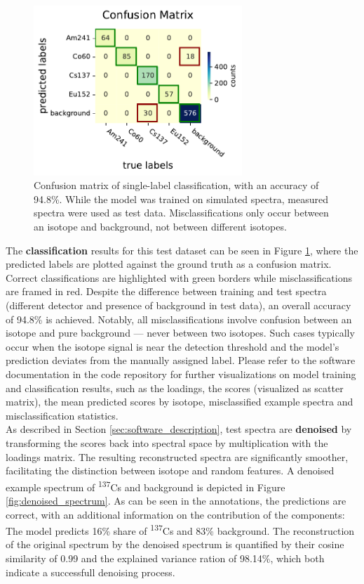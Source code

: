 \documentclass[review, 12pt, a4paper]{elsarticle}
\begin{document}
\begin{figure}
\centering
\includegraphics[width=0.7\textwidth]{Confusion_matrix_.pdf}
\caption{Confusion matrix of single-label classification, with an accuracy of 94.8\%. While the model was trained on simulated spectra, measured spectra were used as test data. Misclassifications only occur between an isotope and background, not between different isotopes.}
\label{fig:confusion_matrix}
\end{figure}

The \textbf{classification} results for this test dataset can be seen in Figure \ref{fig:confusion_matrix}, where the predicted labels are plotted against the ground truth as a confusion matrix. Correct classifications are highlighted with green borders while misclassifications are framed in red. Despite the difference between training and test spectra (different detector and presence of background in test data), an overall accuracy of 94.8\% is achieved. Notably, all misclassifications involve confusion between an isotope and pure background — never between two isotopes. Such cases typically occur when the isotope signal is near the detection threshold and the model's prediction deviates from the manually assigned label. Please refer to the software documentation in the code repository for further visualizations on model training and classification results, such as the loadings, the scores (visualized as scatter matrix), the mean predicted scores by isotope, misclassified example spectra and misclassification statistics. \\

As described in Section \ref{sec:software_description}, test spectra are \textbf{denoised} by transforming the scores back into spectral space by multiplication with the loadings matrix. The resulting reconstructed spectra are significantly smoother, facilitating the distinction between isotope and random features. A denoised example spectrum of \textsuperscript{137}Cs and background is depicted in Figure \ref{fig:denoised_spectrum}. As can be seen in the annotations, the predictions are correct, with an additional information on the contribution of the components: The model predicts 16\% share of \textsuperscript{137}Cs and 83\% background. The reconstruction of the original spectrum by the denoised spectrum is quantified by their cosine similarity of 0.99 and the explained variance ration of 98.14\%, which both indicate a successfull denoising process. \\
\end{document}
